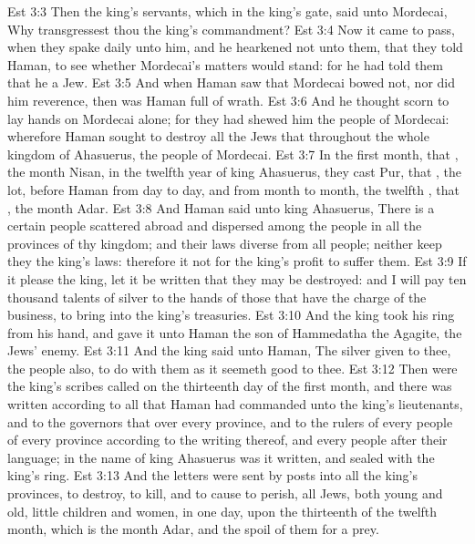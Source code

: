 \vs Est 3:3 Then the king's servants, which  in the king's gate, said unto Mordecai, Why transgressest thou the king's commandment?
\vs Est 3:4 Now it came to pass, when they spake daily unto him, and he hearkened not unto them, that they told Haman, to see whether Mordecai's matters would stand: for he had told them that he  a Jew.
\vs Est 3:5 And when Haman saw that Mordecai bowed not, nor did him reverence, then was Haman full of wrath.
\vs Est 3:6 And he thought scorn to lay hands on Mordecai alone; for they had shewed him the people of Mordecai: wherefore Haman sought to destroy all the Jews that  throughout the whole kingdom of Ahasuerus,  the people of Mordecai.
\vs Est 3:7 In the first month, that , the month Nisan, in the twelfth year of king Ahasuerus, they cast Pur, that , the lot, before Haman from day to day, and from month to month,  the twelfth , that , the month Adar.
\vs Est 3:8 And Haman said unto king Ahasuerus, There is a certain people scattered abroad and dispersed among the people in all the provinces of thy kingdom; and their laws  diverse from all people; neither keep they the king's laws: therefore it  not for the king's profit to suffer them.
\vs Est 3:9 If it please the king, let it be written that they may be destroyed: and I will pay ten thousand talents of silver to the hands of those that have the charge of the business, to bring  into the king's treasuries.
\vs Est 3:10 And the king took his ring from his hand, and gave it unto Haman the son of Hammedatha the Agagite, the Jews' enemy.
\vs Est 3:11 And the king said unto Haman, The silver  given to thee, the people also, to do with them as it seemeth good to thee.
\vs Est 3:12 Then were the king's scribes called on the thirteenth day of the first month, and there was written according to all that Haman had commanded unto the king's lieutenants, and to the governors that  over every province, and to the rulers of every people of every province according to the writing thereof, and  every people after their language; in the name of king Ahasuerus was it written, and sealed with the king's ring.
\vs Est 3:13 And the letters were sent by posts into all the king's provinces, to destroy, to kill, and to cause to perish, all Jews, both young and old, little children and women, in one day,  upon the thirteenth  of the twelfth month, which is the month Adar, and  the spoil of them for a prey.
